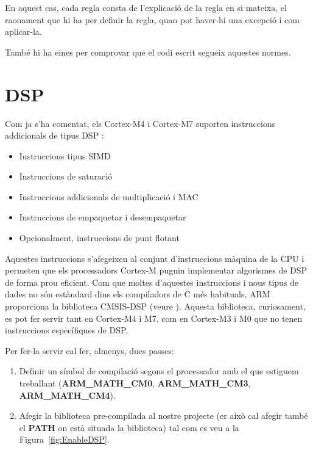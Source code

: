 En aquest cas, cada regla consta de l'explicació de la regla en si mateixa, el raonament que hi ha per definir la regla, quan pot haver-hi una excepció i com aplicar-la.

També hi ha eines per comprovar que el codi escrit segueix aquestes normes.


\chapter{DSP}
\label{ch:DSP}
Com ja s'ha comentat, els Cortex-M4 i Cortex-M7 suporten instruccions addicionals de tipus \gls{DSP} \cite[173]{GuideCortexM3M4}\cite[255]{DesignersGuide}:
\begin{itemize}
 \item Instruccions tipus \gls{SIMD}
 \item Instruccions de saturació
 \item Instruccions addicionals de multiplicació i \gls{MAC}
 \item Instruccions de empaquetar i desempaquetar
 \item Opcionalment, instruccions de punt flotant
\end{itemize}

Aquestes instruccions s'afegeixen al conjunt d'instruccions màquina de la CPU i permeten que els processadors Cortex-M puguin implementar algorismes de DSP de forma prou eficient. Com que moltes d'aquestes instruccions i nous tipus de dades no són estàndard dins els compiladors de C més habituals, \gls{ARM} proporciona la biblioteca CMSIS-DSP (veure ). Aquesta biblioteca, curiosament, es pot fer servir tant en Cortex-M4 i M7, com en Cortex-M3 i M0 que no tenen instruccions específiques de DSP.

Per fer-la servir cal fer, almenys, dues passes:
\begin{enumerate}
 \item Definir un símbol de compilació segons el processador amb el que estiguem treballant ({\bf ARM\_MATH\_CM0}, {\bf ARM\_MATH\_CM3}, {\bf ARM\_MATH\_CM4}).
 \item Afegir la biblioteca pre-compilada al nostre projecte (er això cal afegir també el {\bf PATH} on està situada la biblioteca) tal com es veu a la Figura~\ref{fig:EnableDSP}.
\end{enumerate}

